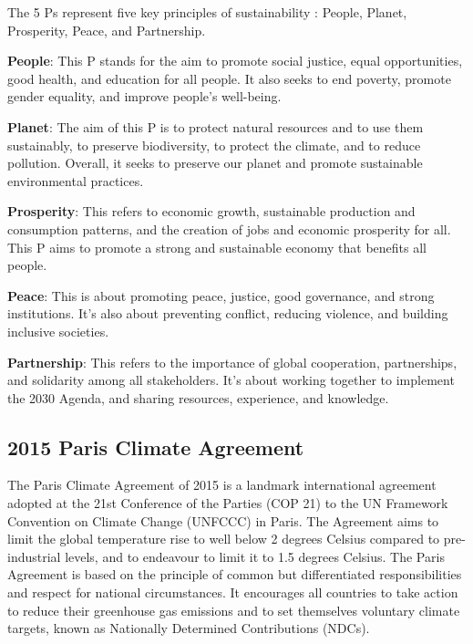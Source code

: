 \documentclass[
  a4paper,
  openany]{book}
\begin{document}
\begin{tcolorbox}[enhanced jigsaw, coltitle=black, bottomtitle=1mm, opacitybacktitle=0.6, titlerule=0mm, opacityback=0, leftrule=.75mm, colbacktitle=quarto-callout-note-color!10!white, bottomrule=.15mm, toptitle=1mm, breakable, title={The 5 Ps of the SDGs}, arc=.35mm, rightrule=.15mm, toprule=.15mm, left=2mm, colback=white, colframe=quarto-callout-note-color-frame]

The 5 Ps represent five key principles of sustainability : People,
Planet, Prosperity, Peace, and Partnership.

\textbf{People}: This P stands for the aim to promote social justice,
equal opportunities, good health, and education for all people. It also
seeks to end poverty, promote gender equality, and improve people's
well-being.

\textbf{Planet}: The aim of this P is to protect natural resources and
to use them sustainably, to preserve biodiversity, to protect the
climate, and to reduce pollution. Overall, it seeks to preserve our
planet and promote sustainable environmental practices.

\textbf{Prosperity}: This refers to economic growth, sustainable
production and consumption patterns, and the creation of jobs and
economic prosperity for all. This P aims to promote a strong and
sustainable economy that benefits all people.

\textbf{Peace}: This is about promoting peace, justice, good governance,
and strong institutions. It's also about preventing conflict, reducing
violence, and building inclusive societies.

\textbf{Partnership}: This refers to the importance of global
cooperation, partnerships, and solidarity among all stakeholders. It's
about working together to implement the 2030 Agenda, and sharing
resources, experience, and knowledge.

\end{tcolorbox}

\subsection{2015 Paris Climate Agreement}\label{paris-climate-agreement}

The Paris Climate Agreement of 2015 is a landmark international
agreement adopted at the 21st Conference of the Parties (COP 21) to the
UN Framework Convention on Climate Change (UNFCCC) in Paris. The
Agreement aims to limit the global temperature rise to well below 2
degrees Celsius compared to pre-industrial levels, and to endeavour to
limit it to 1.5 degrees Celsius. The Paris Agreement is based on the
principle of common but differentiated responsibilities and respect for
national circumstances. It encourages all countries to take action to
reduce their greenhouse gas emissions and to set themselves voluntary
climate targets, known as Nationally Determined Contributions (NDCs).
\end{document}
